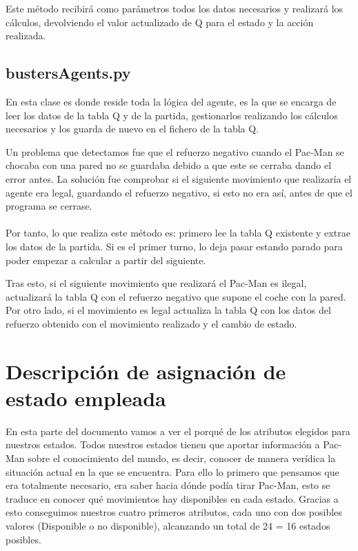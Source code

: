 \documentclass[11pt,a4paper]{article}
\begin{document}
Este método recibirá como parámetros todos los datos necesarios y realizará los cálculos, devolviendo el valor actualizado de Q para el estado y la acción realizada.

\subsection{bustersAgents.py}

En esta clase es donde reside toda la lógica del agente, es la que se encarga de leer los datos de la tabla Q y de la partida, gestionarlos realizando los cálculos necesarios y los guarda de nuevo en el fichero de la tabla Q.

Un problema que detectamos fue que el refuerzo negativo cuando el Pac-Man se chocaba con una pared no se guardaba debido a que este se cerraba dando el error antes. La solución fue comprobar si el siguiente movimiento que realizaría el agente era legal, guardando el refuerzo negativo, si esto no era así, antes de que el programa se cerrase.

\paragraph{}

Por tanto, lo que realiza este método es: primero lee la tabla Q existente y extrae los datos de la partida. Si es el primer turno, lo deja pasar estando parado para poder empezar a calcular a partir del siguiente.

Tras esto, si el siguiente movimiento que realizará el Pac-Man es ilegal, actualizará la tabla Q con el refuerzo negativo que supone el coche con la pared. Por otro lado, si el movimiento es legal actualiza la tabla Q con los datos del refuerzo obtenido con el movimiento realizado y el cambio de estado.

\section{Descripción de asignación de estado empleada}

En esta parte del documento vamos a ver el porqué de los atributos elegidos para nuestros estados.
Todos nuestros estados tienen que aportar información a Pac-Man sobre el conocimiento del mundo, es decir, conocer de manera verídica la situación actual en la que se encuentra. Para ello lo primero que pensamos que era totalmente necesario, era saber hacia dónde podía tirar Pac-Man, esto se traduce en conocer qué movimientos hay disponibles en cada estado. Gracias a esto conseguimos nuestros cuatro primeros atributos, cada uno con dos posibles valores (Disponible o no disponible), alcanzando un total de 24 = 16 estados posibles. 
\end{document}
